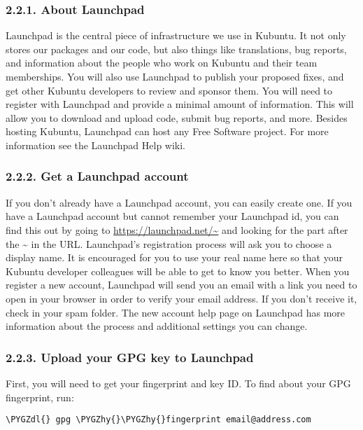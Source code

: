 \documentclass[letterpaper,10pt,english]{sphinxmanual}
\def\PYGZdl{\char`\$}
\def\PYGZhy{\char`\-}
\begin{document}
\subsubsection{2.2.1. About Launchpad}
\label{docs/packaging_guide/getting_started:about-launchpad}
Launchpad is the central piece of infrastructure we use in Kubuntu. It not only stores our packages and our code, but also things like translations, bug reports, and information about the people who work on Kubuntu and their team memberships. You will also use Launchpad to publish your proposed fixes, and get other Kubuntu developers to review and sponsor them.
You will need to register with Launchpad and provide a minimal amount of information. This will allow you to download and upload code, submit bug reports, and more.
Besides hosting Kubuntu, Launchpad can host any Free Software project. For more information see the Launchpad Help wiki.


\subsubsection{2.2.2. Get a Launchpad account}
\label{docs/packaging_guide/getting_started:get-a-launchpad-account}
If you don’t already have a Launchpad account, you can easily create one. If you have a Launchpad account but cannot remember your Launchpad id, you can find this out by going to \url{https://launchpad.net/~} and looking for the part after the \textasciitilde{} in the URL.
Launchpad’s registration process will ask you to choose a display name. It is encouraged for you to use your real name here so that your Kubuntu developer colleagues will be able to get to know you better.
When you register a new account, Launchpad will send you an email with a link you need to open in your browser in order to verify your email address. If you don’t receive it, check in your spam folder.
The new account help page on Launchpad has more information about the process and additional settings you can change.


\subsubsection{2.2.3. Upload your GPG key to Launchpad}
\label{docs/packaging_guide/getting_started:upload-your-gpg-key-to-launchpad}
First, you will need to get your fingerprint and key ID.
To find about your GPG fingerprint, run:

\begin{Verbatim}[commandchars=\\\{\}]
\PYGZdl{} gpg \PYGZhy{}\PYGZhy{}fingerprint email@address.com
\end{Verbatim}
\end{document}
